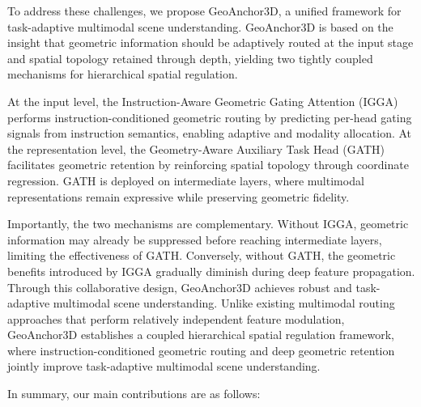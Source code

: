 \documentclass[lettersize,journal]{IEEEtran}
\begin{document}
To address these challenges, we propose GeoAnchor3D, a unified framework for task-adaptive multimodal scene understanding. GeoAnchor3D is based on the insight that geometric information should be adaptively routed at the input stage and spatial topology retained through depth, yielding two tightly coupled mechanisms {for hierarchical spatial regulation.}

At the input level, the Instruction-Aware Geometric Gating Attention (IGGA) performs instruction-conditioned geometric routing by predicting per-head gating signals from instruction semantics, enabling adaptive and modality allocation. At the representation level, the Geometry-Aware Auxiliary Task Head (GATH) facilitates geometric retention by reinforcing spatial topology through coordinate regression. GATH is deployed on intermediate layers, where multimodal representations remain expressive while preserving geometric fidelity.

Importantly, the two mechanisms are complementary. Without IGGA, geometric information may already be suppressed before reaching intermediate layers, limiting the effectiveness of GATH. Conversely, without GATH, the geometric benefits introduced by IGGA gradually diminish during deep feature propagation. Through this collaborative design, GeoAnchor3D achieves robust and task-adaptive multimodal scene understanding. Unlike existing multimodal routing approaches that perform relatively independent feature modulation, GeoAnchor3D establishes a coupled hierarchical spatial regulation framework, where instruction-conditioned geometric routing and deep geometric retention jointly improve task-adaptive multimodal scene understanding.

In summary, our main contributions are as follows:
\end{document}
